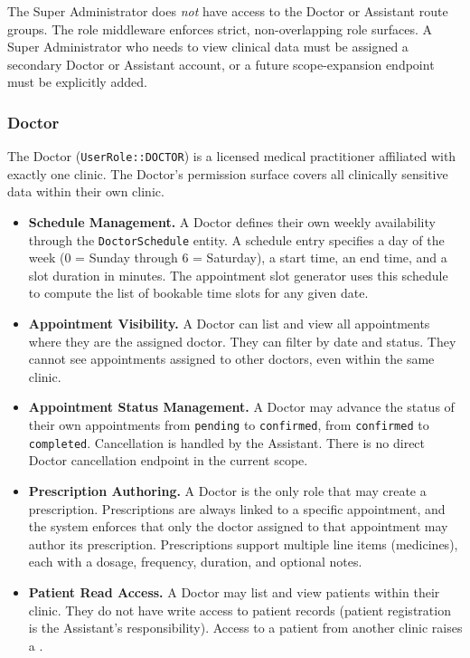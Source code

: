 The Super Administrator does \emph{not} have access to the Doctor or
Assistant route groups. The role middleware enforces strict, non-overlapping
role surfaces. A Super Administrator who needs to view clinical data
must be assigned a secondary Doctor or Assistant account, or a future
scope-expansion endpoint must be explicitly added.

\subsubsection{Doctor}

The Doctor (\texttt{UserRole::DOCTOR}) is a licensed medical practitioner
affiliated with exactly one clinic. The Doctor's permission surface
covers all clinically sensitive data within their own clinic.

\begin{itemize}
  \item \textbf{Schedule Management.} A Doctor defines their own weekly
    availability through the \texttt{DoctorSchedule} entity. A schedule
    entry specifies a day of the week (0 = Sunday through 6 = Saturday),
    a start time, an end time, and a slot duration in minutes. The
    appointment slot generator uses this schedule to compute the list
    of bookable time slots for any given date.
  \item \textbf{Appointment Visibility.} A Doctor can list and view all
    appointments where they are the assigned doctor. They can filter
    by date and status. They cannot see appointments assigned to other
    doctors, even within the same clinic.
  \item \textbf{Appointment Status Management.} A Doctor may advance
    the status of their own appointments from \texttt{pending} to
    \texttt{confirmed}, from \texttt{confirmed} to \texttt{completed}.
    Cancellation is handled by the Assistant. There is no direct
    Doctor cancellation endpoint in the current scope.
  \item \textbf{Prescription Authoring.} A Doctor is the only role that
    may create a prescription. Prescriptions are always linked to a
    specific appointment, and the system enforces that only the
    doctor assigned to that appointment may author its prescription.
    Prescriptions support multiple line items (medicines), each with
    a dosage, frequency, duration, and optional notes.
  \item \textbf{Patient Read Access.} A Doctor may list and view patients
    within their clinic. They do not have write access to patient records
    (patient registration is the Assistant's responsibility). Access to
    a patient from another clinic raises a
    .
\end{itemize}

